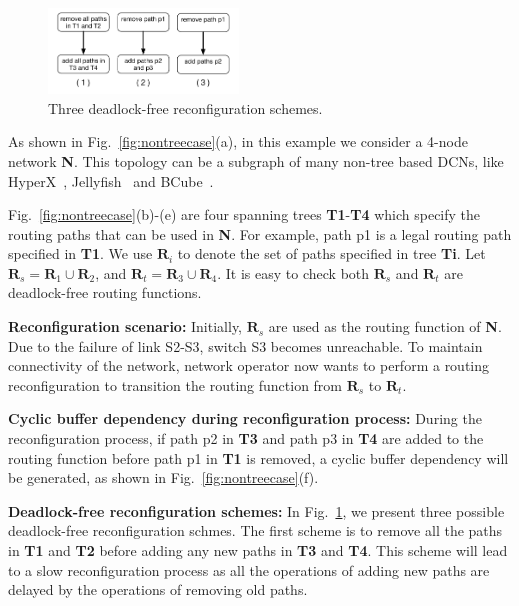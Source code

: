 \begin{figure}[t]
	\centering
	\includegraphics[width=0.45\textwidth] {figs/nontreecase_dfschemes}
	\caption{Three deadlock-free reconfiguration schemes.}\label{fig:dfschemes}
	
\end{figure}

As shown in Fig.~\ref{fig:nontreecase}(a), in this example we consider a 4-node network \textbf{N}. This topology can be a subgraph of many non-tree based DCNs, like HyperX~\cite{hyperx}, Jellyfish~\cite{jellyfish} and BCube~\cite{bcube}.

Fig.~\ref{fig:nontreecase}(b)-(e) are four spanning trees \textbf{T1}-\textbf{T4} which specify the routing paths that can be used in \textbf{N}. For example, path p1 is a legal routing path specified in \textbf{T1}.  We use $\textbf{R}_i$ to denote the set of paths specified in tree \textbf{Ti}. Let $\textbf{R}_s = \textbf{R}_1 \cup \textbf{R}_2$, and $\textbf{R}_t = \textbf{R}_3 \cup \textbf{R}_4$. It is easy to check both $\textbf{R}_s$ and $\textbf{R}_t$ are deadlock-free routing functions. 

\textbf{Reconfiguration scenario:} Initially, $\textbf{R}_s$ are used as the routing function of \textbf{N}. Due to the failure of link S2-S3, switch S3 becomes unreachable. To maintain connectivity of the network, network operator now wants to perform a routing reconfiguration to transition the routing function from $\textbf{R}_s$ to $\textbf{R}_t$.

\textbf{Cyclic buffer dependency during reconfiguration process:} During the reconfiguration process, if path p2 in \textbf{T3} and path p3 in \textbf{T4} are added to the routing function before path p1 in \textbf{T1} is removed, a cyclic buffer dependency will be generated, as shown in Fig.~\ref{fig:nontreecase}(f).

\textbf{Deadlock-free reconfiguration schemes:} In Fig.~\ref{fig:dfschemes}, we present three possible deadlock-free reconfiguration schmes. The first scheme is to remove all the paths in \textbf{T1} and \textbf{T2} before adding any new paths in \textbf{T3} and \textbf{T4}. This scheme will lead to a slow reconfiguration process as all the operations of adding new paths are delayed by the operations of removing old paths. 

